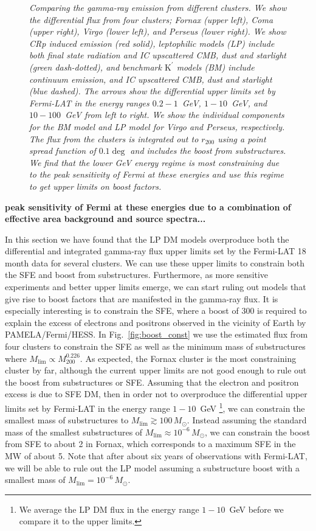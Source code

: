 \documentclass[10pt,aps,pra,reprint,amsmath,amsfonts,amssymb,showpacs,nofootinbib,floatfix]{revtex4-1}
\newcommand{\rmn}{\mathrm}
\newcommand{\msun}{M_\odot}
\newcommand{\Kp}{\rmn{K}^\prime}
\newcommand{\rvir}{r_{200}}
\newcommand{\mvir}{M_{200}}
\begin{document}
\begin{figure}
\begin{minipage}{2.0\columnwidth}
\caption{\it Comparing the gamma-ray emission from different
  clusters. We show the differential flux from four clusters; Fornax
  (upper left), Coma (upper right), Virgo (lower left), and Perseus
  (lower right). We show CRp induced emission (red solid), leptophilic
  models (LP) include both final state radiation and IC upscattered
  CMB, dust and starlight (green dash-dotted), and benchmark $\Kp$
  models (BM) include continuum emission, and IC upscattered CMB, dust
  and starlight (blue dashed). The arrows show the differential upper
  limits set by Fermi-LAT in the energy ranges $0.2-1$~GeV,
  $1-10$~GeV, and $10-100$~GeV from left to right. We show the
  individual components for the BM model and LP model for Virgo and
  Perseus, respectively. The flux from the clusters is integrated out
  to $\rvir$ using a point spread function of $0.1\deg$ and includes
  the boost from substructures. We find that the lower GeV energy
  regime is most constraining due to the peak sensitivity of Fermi at
  these energies and use this regime to get upper limits on boost
  factors.}
 \label{fig:clu_comp}
\end{minipage}
\end{figure}

{\bf
peak sensitivity of Fermi at these energies due to a combination of effective area background and source spectra...}

In this section we have found that the LP DM models overproduce both
the differential and integrated gamma-ray flux upper limits set by the
Fermi-LAT 18 month data for several clusters. We can use these upper
limits to constrain both the SFE and boost from
substructures. Furthermore, as more sensitive experiments and better
upper limits emerge, we can start ruling out models that give rise to
boost factors that are manifested in the gamma-ray flux. It is
especially interesting is to constrain the SFE, where a boost of 300
is required to explain the excess of electrons and positrons observed
in the vicinity of Earth by PAMELA/Fermi/HESS. In
Fig.~\ref{fig:boost_const} we use the estimated flux from four
clusters to constrain the SFE as well as the minimum mass of
substructures where $M_\rmn{lim}\propto\mvir^{0.226}$. As expected,
the Fornax cluster is the most constraining cluster by far, although
the current upper limits are not good enough to rule out the boost
from substructures or SFE. Assuming that the electron and positron
excess is due to SFE DM, then in order not to overproduce the
differential upper limits set by Fermi-LAT in the energy range
$1-10$~GeV \footnote{We average the LP DM flux in the energy range
  $1-10$~GeV before we compare it to the upper limits.}, we can
constrain the smallest mass of substructures to $M_\rmn{lim}\gtrsim
100\,\msun$. Instead assuming the standard mass of the smallest
substructures of $M_\rmn{lim}\approx 10^{-6}\,\msun$, we can constrain
the boost from SFE to about 2 in Fornax, which corresponds to a
maximum SFE in the MW of about 5. Note that after about six years of
observations with Fermi-LAT, we will be able to rule out the LP model
assuming a substructure boost with a smallest mass of $M_\rmn{lim} =
10^{-6}\,\msun$.
\end{document}
